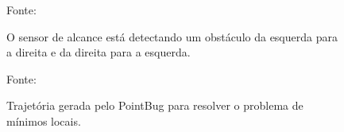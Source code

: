 \documentclass[xcolor=dvipsnames, aspectratio=169]{beamer}
\begin{document}
\begin{frame}
  \begin{figure}
    \centering
    {Fonte: \cite{buniyamin2011simple}}
    \caption{O sensor de alcance está detectando um obstáculo da esquerda para a direita e da direita para a esquerda.}
    \label{fig:1_range_sensor_obstacle}
  \end{figure}
  \begin{figure}
    \centering
    {Fonte: \cite{buniyamin2011simple}}
    \caption{Trajetória gerada pelo PointBug para resolver o problema de mínimos locais.}
    \label{fig:2_range_sensor_obstacle}
  \end{figure}
\end{frame}
  
\end{document}
